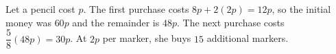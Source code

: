 Let a pencil cost $p$. The first purchase costs $8p+2(2p)=12p$, so the initial money was $60p$ and the remainder is $48p$. The next purchase costs $\dfrac{5}{8}(48p)=30p$. At $2p$ per marker, she buys $\boxed{15}$ additional markers.
